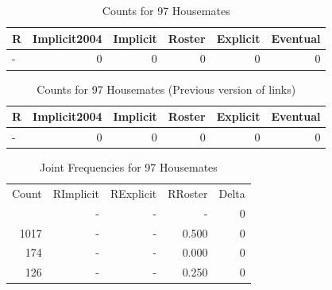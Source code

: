 \documentclass[a4paper]{article}\usepackage[]{graphicx}\usepackage[]{color}
\begin{document}
\begin{table}[ht]
\centering
\begingroup\large
\begin{tabular}{lrrrrr}
  \hline
R & Implicit2004 & Implicit & Roster & Explicit & Eventual \\ 
  \hline
- &   0 &   0 &   0 &   0 &   0 \\ 
   \hline
\end{tabular}
\endgroup
\caption{Counts for 97 Housemates} 
\end{table}
\begin{table}[ht]
\centering
\begingroup\large
\begin{tabular}{lrrrrr}
  \hline
R & Implicit2004 & Implicit & Roster & Explicit & Eventual \\ 
  \hline
- &   0 &   0 &   0 &   0 &   0 \\ 
   \hline
\end{tabular}
\endgroup
\caption{Counts for 97 Housemates (Previous version of links)} 
\end{table}


\begin{table}[ht]
\centering
\begin{tabular}{rrrrr}
  \hline
Count & RImplicit & RExplicit & RRoster & Delta \\ 
  \rowcolor{nullColor}  \hline
1202 & - & - & - & 0 \\ 
   \rowcolor{nullColor} 1017 & - & - & 0.500 & 0 \\ 
   \rowcolor{nullColor} 174 & - & - & 0.000 & 0 \\ 
   \rowcolor{nullColor} 126 & - & - & 0.250 & 0 \\ 
   \hline
\end{tabular}
\caption{Joint Frequencies for 97 Housemates} 
\end{table}
\end{document}
